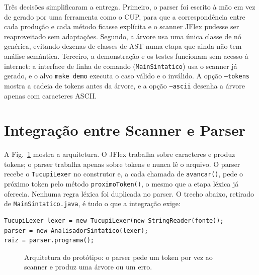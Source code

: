 \documentclass[conference,a4paper]{IEEEtran}
\newcommand{\cod}[1]{\texttt{#1}}
\begin{document}
Três decisões simplificaram a entrega. Primeiro, o parser foi escrito à mão em vez de gerado por uma ferramenta como o CUP, para que a correspondência entre cada produção e cada método ficasse explícita e o scanner JFlex pudesse ser reaproveitado sem adaptações. Segundo, a árvore usa uma única classe de nó genérica, evitando dezenas de classes de AST numa etapa que ainda não tem análise semântica. Terceiro, a demonstração e os testes funcionam sem acesso à internet: a interface de linha de comando (\cod{MainSintatico}) usa o scanner já gerado, e o alvo \cod{make demo} executa o caso válido e o inválido. A opção \cod{--tokens} mostra a cadeia de tokens antes da árvore, e a opção \cod{--ascii} desenha a árvore apenas com caracteres ASCII.

\section{Integração entre Scanner e Parser}

A Fig.~\ref{fig:arq} mostra a arquitetura. O JFlex trabalha sobre caracteres e produz tokens; o parser trabalha apenas sobre tokens e nunca lê o arquivo. O parser recebe o \cod{TucupiLexer} no construtor e, a cada chamada de \cod{avancar()}, pede o próximo token pelo método \cod{proximoToken()}, o mesmo que a etapa léxica já oferecia. Nenhuma regra léxica foi duplicada no parser. O trecho abaixo, retirado de \cod{MainSintatico.java}, é tudo o que a integração exige:
\begin{lstlisting}[style=java]
TucupiLexer lexer = new TucupiLexer(new StringReader(fonte));
parser = new AnalisadorSintatico(lexer);
raiz = parser.programa();
\end{lstlisting}

\begin{figure}[t]
\centering
{}
\caption{Arquitetura do protótipo: o parser pede um token por vez ao scanner e produz uma árvore ou um erro.}
\label{fig:arq}
\end{figure}
\end{document}
